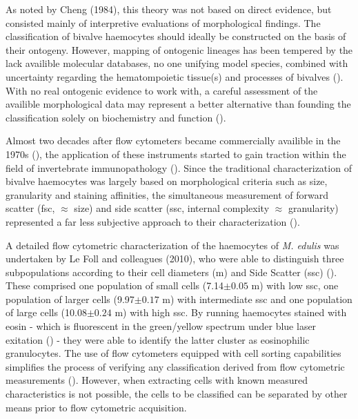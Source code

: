 As noted by Cheng (1984), this theory was not based on direct evidence, but consisted mainly of interpretive evaluations of morphological findings. The classification of bivalve haemocytes should ideally be constructed on the basis of their ontogeny. However, mapping of ontogenic lineages has been tempered by the lack availible molecular databases, no one unifying model species, combined with uncertainty regarding the hematompoietic tissue(s) and processes of bivalves (\cite{Hine1999, Smith2016, Pila2016, delaBallina2022}). With no real ontogenic evidence to work with, a careful assessment of the availible morphological data may represent a better alternative than founding the classification solely on biochemistry and function (\cite{Hine1999}). 

Almost two decades after flow cytometers became commercially availible in the 1970s (\cite{Shapiro2004}), the application of these instruments started to gain traction within the field of invertebrate immunopathology (\cite{Fisher1988}). Since the traditional characterization of bivalve haemocytes was largely based on morphological criteria such as size, granularity and staining affinities, the simultaneous measurement of forward scatter (\acrshort{fsc}, $\approx$ size) and side scatter (\acrshort{ssc}, internal complexity $\approx$ granularity) represented a far less subjective approach to their characterization (\cite{AshtonAlcox1998, Allam2002, Mateo2009}).

A detailed flow cytometric characterization of the haemocytes of \emph{M. edulis} was undertaken by Le Foll and colleagues (2010), who were able to distinguish three subpopulations according to their cell diameters (\micro m) and Side Scatter (\acrshort{ssc}) (\cite{LeFoll2010}). These comprised one population of small cells (7.14$\pm{0.05}$ \micro m) with low \acrshort{ssc}, one population of larger cells (9.97$\pm{0.17}$ \micro m) with intermediate \acrshort{ssc} and one population of large cells (10.08$\pm{0.24}$ \micro m) with high \acrshort{ssc}. By running haemocytes stained with eosin - which is fluorescent in the green/yellow spectrum under blue laser exitation (\cite{Elfer2016, Koegle2020}) - they were able to identify the latter cluster as eosinophilic granulocytes. The use of flow cytometers equipped with cell sorting capabilities simplifies the process of verifying any classification derived from flow cytometric measurements (\cite{Shapiro2004}). However, when extracting cells with known measured characteristics is not possible, the cells to be classified can be separated by other means prior to flow cytometric acquisition.

